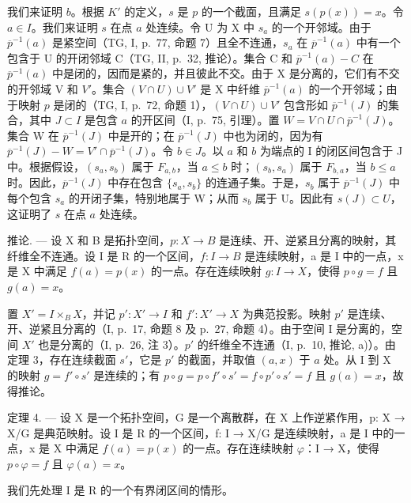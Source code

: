 我们来证明 \(b\)。根据 \(K'\) 的定义，\(s\) 是 \(p\) 的一个截面，且满足 \(s(p(x)) = x\)。令 \(a \in I\)。我们来证明 \(s\) 在点 \(a\) 处连续。令 U 为 X 中 \(s_a\) 的一个开邻域。由于 \(\overline{p}^{-1}(a)\) 是紧空间（TG, I, p.~77, 命题 7）且全不连通，\(s_a\) 在 \(\overline{p}^{-1}(a)\) 中有一个包含于 U 的开闭邻域 C（TG, II, p.~32, 推论）。集合 C 和 \(\overline{p}^{-1}(a) - C\) 在 \(\overline{p}^{-1}(a)\) 中是闭的，因而是紧的，并且彼此不交。由于 X 是分离的，它们有不交的开邻域 V 和 \(V'\)。集合 \((V \cap U) \cup V'\) 是 X 中纤维 \(\overline{p}^{-1}(a)\) 的一个开邻域；由于映射 \(p\) 是闭的（TG, I, p.~72, 命题 1），\((V \cap U) \cup V'\) 包含形如 \(\overline{p}^{-1}(J)\) 的集合，其中 \(J \subset I\) 是包含 \(a\) 的开区间（I, p.~75, 引理）。置 \(W = V \cap U \cap \overline{p}^{-1}(J)\)。集合 W 在 \(\overline{p}^{-1}(J)\) 中是开的；在 \(\overline{p}^{-1}(J)\) 中也为闭的，因为有 \(\overline{p}^{-1}(J) - W = V' \cap \overline{p}^{-1}(J)\)。令 \(b \in J\)。以 \(a\) 和 \(b\) 为端点的 I 的闭区间包含于 J 中。根据假设，\((s_a, s_b)\) 属于 \(F_{a,b}\)，当 \(a \leqslant b\) 时；\((s_b, s_a)\) 属于 \(F_{b,a}\)，当 \(b \leqslant a\) 时。因此，\(\overline{p}^{-1}(J)\) 中存在包含 \(\{s_a, s_b\}\) 的连通子集。于是，\(s_b\) 属于 \(\overline{p}^{-1}(J)\) 中每个包含 \(s_a\) 的开闭子集，特别地属于 W；从而 \(s_b\) 属于 U。因此有 \(s(J) \subset U\)，这证明了 \(s\) 在点 \(a\) 处连续。

推论. --- 设 X 和 B 是拓扑空间，\(p: X \to B\) 是连续、开、逆紧且分离的映射，其纤维全不连通。设 I 是 R 的一个区间，\(f: I \to B\) 是连续映射，a 是 I 中的一点，x 是 X 中满足 \(f(a) = p(x)\) 的一点。存在连续映射 \(g: I \to X\)，使得 \(p \circ g = f\) 且 \(g(a) = x\)。

置 \(X' = I \times_{B} X\)，并记 \(p'\colon X'\to I\) 和 \(f'\colon X'\to X\) 为典范投影。映射 \(p'\) 是连续、开、逆紧且分离的（I, p.~17, 命题 8 及 p.~27, 命题 4）。由于空间 I 是分离的，空间 \(X'\) 也是分离的（I, p.~26, 注 3）。\(p'\) 的纤维全不连通（I, p.~10, 推论, a)）。由定理 3，存在连续截面 \(s'\)，它是 \(p'\) 的截面，并取值 \((a,x)\) 于 \(a\) 处。从 I 到 X 的映射 \(g = f'\circ s'\) 是连续的；有 \(p\circ g = p\circ f'\circ s' = f\circ p'\circ s' = f\) 且 \(g(a) = x\)，故得推论。

定理 4. --- 设 X 是一个拓扑空间，G 是一个离散群，在 X 上作逆紧作用，p: X → X/G 是典范映射。设 I 是 R 的一个区间，f: I → X/G 是连续映射，a 是 I 中的一点，x 是 X 中满足 \(f(a) = p(x)\) 的一点。存在连续映射 \(\varphi\)：I → X，使得 \(p \circ \varphi = f\) 且 \(\varphi(a) = x\)。

我们先处理 I 是 R 的一个有界闭区间的情形。

